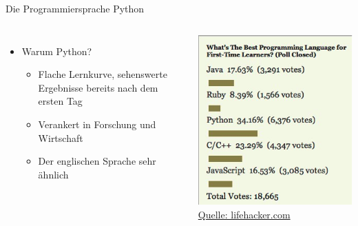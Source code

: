 \begin{frame}{Die Programmiersprache Python}
\begin{columns}
    \begin{itemize}
        \item Warum Python?
            \begin{itemize}
                \item Flache Lernkurve, sehenswerte Ergebnisse bereits nach dem ersten Tag
                \item Verankert in Forschung und Wirtschaft
                \item Der englischen Sprache sehr ähnlich
            \end{itemize}
    \end{itemize}
    \centering\includegraphics[scale=0.5]{images/best_lang} 
    \hyperlink{https://lifehacker.com/five-best-programming-languages-for-first-time-learners-1494256243}{\tiny{Quelle: lifehacker.com}}
\end{columns}
\end{frame}

